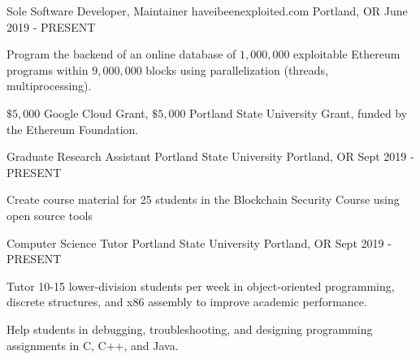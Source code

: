 
\begin{cventries}
  \cventry
    {\normalsize Sole Software Developer, Maintainer} %
    {haveibeenexploited.com} %
    {\normalsize Portland, OR} %
    {\normalsize June 2019 - PRESENT} %
    {
    \large
      \begin{cvitems} %
        \item{Program the backend of an online database of $1,000,000$ exploitable Ethereum programs within $9,000,000$ blocks using parallelization (threads, multiprocessing).}
         \item {$\$5,000$ Google Cloud Grant, $\$5,000$ Portland State University Grant, funded by the Ethereum Foundation.}
      \end{cvitems}
    }

  \cventry
    {\normalsize Graduate Research Assistant} %
    {Portland State University} %
    {\normalsize Portland, OR} %
    {\normalsize Sept 2019 - PRESENT} %
    {
    \large
      \begin{cvitems} %
        \item {Create course material for 25 students in the Blockchain Security Course using open source tools}
      \end{cvitems}
    }

  \cventry
    {\normalsize Computer Science Tutor} %
    {Portland State University} %
    {\normalsize Portland, OR} %
    {\normalsize Sept 2019 - PRESENT} %
    {
    \large
      \begin{cvitems} %
        \item {Tutor 10-15 lower-division students per week in object-oriented programming, discrete structures, and x86 assembly to improve academic performance.}
        \item{Help students in debugging, troubleshooting, and designing programming assignments in C, C++, and Java.}
      \end{cvitems}
    }

\end{cventries}
